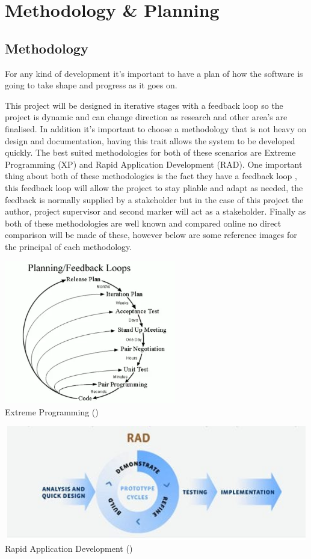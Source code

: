 \section{Methodology \& Planning}
\subsection{Methodology}
For any kind of development it's important to have a plan of how the software is going to take shape and progress as it goes on. 

This project will be designed in iterative stages with a feedback loop so the project is dynamic and can change direction as research and other area's are finalised. In addition it's important to choose a methodology that is not heavy on design and documentation, having this trait allows the system to be developed quickly. The best suited methodologies for both of these scenarios are Extreme Programming (XP) and Rapid Application Development (RAD). One important thing about both of these methodologies is the fact they have a feedback loop , this feedback loop will allow the project to stay pliable and adapt as needed, the feedback is normally supplied by a stakeholder but in the case of this project the author, project supervisor and second marker will act as a stakeholder. Finally as both of these methodologies are well known and compared online no direct comparison will be made of these, however below are some reference images for the principal of each methodology.

\begin{center}
	\includegraphics[width=7.5cm]{./images/methodology/XP.png}\\
	Extreme Programming (\cite{ponomareff_learning})
\end{center}

\begin{center}
	\includegraphics[width=15cm, height=5cm]{./images/methodology/RAD.png}\\
	Rapid Application Development (\cite{ankitasingh_2019_what})
\end{center}

